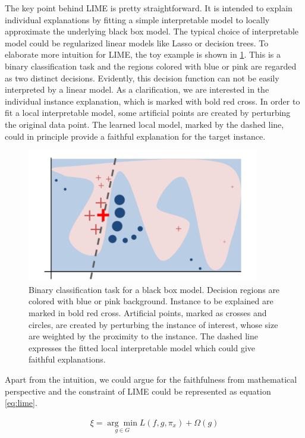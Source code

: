 The key point behind LIME is pretty straightforward. It is intended to explain individual explanations by fitting a simple interpretable model to locally approximate the underlying black box model. The typical choice of interpretable model could be regularized linear models like Lasso or decision trees. To elaborate more intuition for LIME, the toy example is shown in \ref{fig:lime}. This is a binary classification task and the regions colored with blue or pink are regarded as two distinct decisions. Evidently, this decision function can not be easily interpreted by a linear model. As a clarification, we are interested in the individual instance explanation, which is marked with bold red cross. In order to fit a local interpretable model, some artificial points are created by perturbing the original data point. The learned local model, marked by the dashed line, could in principle provide a faithful explanation for the target instance. 

\begin{figure}[H]%
	\includegraphics[width=0.9\textwidth]{imgs/lime.png}
	\caption{Binary classification task for a black box model. Decision regions are colored with blue or pink background. Instance to be explained are marked in bold red cross. Artificial points, marked as crosses and circles, are created by perturbing the instance of interest, whose size are weighted by the proximity to the instance. The dashed line expresses the fitted local interpretable model which could give faithful explanations.}
	\label{fig:lime}
\end{figure}

Apart from the intuition, we could argue for the faithfulness from mathematical perspective and the constraint of LIME could be represented as equation \ref{eq:lime}. 

\begin{equation} \label{eq:lime}
\begin{gathered}
\xi=\underset{g \in {G}}{\arg \min } L\left(f, g, \pi_{x}\right)+\Omega(g)
\end{gathered}
\end{equation}

